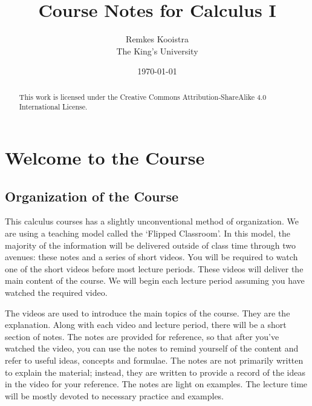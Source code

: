 \documentclass[fleqn]{report}
\begin{document}
\title{Course Notes for Calculus I}
\author{Remkes Kooistra \\
	The King's University}
\date{\today}	

\maketitle

\setcounter{tocdepth}{0}
\tableofcontents
{}

\renewcommand{\chaptername}{Section}
\renewcommand{\abstractname}{License}
\begin{abstract}

This work is licensed under the Creative Commons
Attribution-ShareAlike 4.0 International License.

\end{abstract}

\chapter*{Welcome to the Course}
\label{Welcome to the Course}

\section*{Organization of the Course}

This calculus courses has a slightly unconventional method of
organization. We are using a teaching model
called the `Flipped Classroom'. In this model, the majority of the
information will be delivered outside of class time through
two avenues: these notes and a series of short videos.
You will be required to watch one of the short videos 
before most lecture periods. These videos will deliver the
main content of the course. We will begin each
lecture period assuming you have watched the required video.

The videos are used to introduce the main topics of the
course. They are the explanation. Along with each video and
lecture period, there will be a short section of notes. The
notes are provided for reference, so that after you've watched
the video, you can use the notes to remind yourself of the
content and refer to useful ideas, concepts and formulae. The
notes are not primarily written to explain the material;
instead, they are written to provide a record of the ideas in
the video for your reference. The notes are light on
examples. The lecture time will be mostly devoted to
necessary practice and examples.
\end{document}
